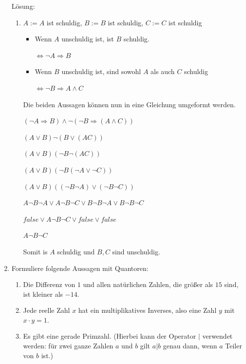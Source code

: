 \documentclass[../main.tex]{subfiles}
\begin{document}
\begin{enumerate}
	      Lösung:
	      \begin{enumerate}
		      \item \( A := A \) ist schuldig, \( B := B \) ist schuldig, \( C := C \) ist schuldig
		            \begin{itemize}
			            \item  Wenn \( A \) unschuldig ist, ist \( B \) schuldig.

			                  \( \Leftrightarrow \neg A \Rightarrow B \)
			            \item  Wenn \( B \) unschuldig ist, sind sowohl \( A \) als auch \( C \) schuldig

			                  \( \Leftrightarrow \neg B \Rightarrow A \land C  \)
		            \end{itemize}

		            Die beiden Aussagen können nun in eine Gleichung umgeformt werden.

		            \( ( \neg A \Rightarrow B ) \land \neg ( \neg B \Rightarrow (A \land C ) ) \)

		            \( ( A \lor B ) \neg ( B \lor  (AC) ) \)

		            \( ( A \lor B ) ( \neg B \neg (AC) ) \)

		            \( ( A \lor B ) ( \neg B (\neg A \lor \neg C) ) \)

		            \( ( A \lor B ) ( (\neg B \neg A ) \lor (\neg B \neg C) ) \)

		            \( A \neg B \neg A \lor A \neg B \neg C \lor B \neg B \neg A \lor B \neg B \neg C \)

		            \( false \lor A \neg B \neg C \lor false \lor false \)

		            \( A \neg B \neg C \)

		            Somit is \( A \) schuldig und \( B, C \) sind unschuldig.
	      \end{enumerate}
	\item Formuliere folgende Aussagen mit Quantoren:
	      \begin{enumerate}
		      \item Die Differenz von \( 1 \) und allen natürlichen Zahlen, die größer als
		            \( 15 \) sind, ist kleiner als \( -14 \).
		      \item Jede reelle Zahl \( x \) hat ein multiplikatives Inverses, also eine Zahl
		            \( y \) mit \( x \cdot y = 1 \).
		      \item Es gibt eine gerade Primzahl.
		            (Hierbei kann der Operator \(|\) verwendet werden: für zwei ganze Zahlen
		            \( a \) und \( b \) gilt \( a | b \) genau dann, wenn \( a \) Teiler von
		            \( b \) ist.)
	      \end{enumerate}


\end{enumerate}
\end{document}
